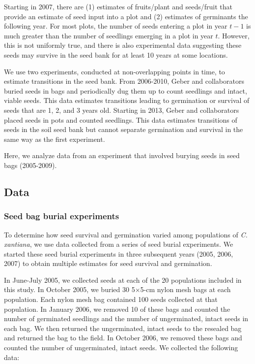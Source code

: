 \documentclass[12pt, oneside, titlepage]{article}   	%
\begin{document}
Starting in 2007, there are (1) estimates of fruits/plant and seeds/fruit that provide an estimate of seed input into a plot and (2) estimates of germinants the following year. For most plots, the number of seeds entering a plot in year $t-1$ is much greater than the number of seedlings emerging in a plot in year $t$. However, this is not uniformly true, and there is also experimental data suggesting these seeds may survive in the seed bank for at least 10 years at some locations.

We use two experiments, conducted at non-overlapping points in time, to estimate transitions in the seed bank. From 2006-2010, Geber and collaborators buried seeds in bags and periodically dug them up to count seedlings and intact, viable seeds. This data estimates transitions leading to germination or survival of seeds that are 1, 2, and 3 years old. Starting in 2013, Geber and collaborators placed seeds in pots and counted seedlings. This data estimates transitions of seeds in the soil seed bank but cannot separate germination and survival in the same way as the first experiment.

Here, we analyze data from an experiment that involved burying seeds in seed bags (2005-2009). 

\subsection*{Data}

\subsubsection*{Seed bag burial experiments}

To determine how seed survival and germination varied among populations of \textit{C. xantiana}, we use data collected from a series of seed burial experiments. We started these seed burial experiments in three subsequent years (2005, 2006, 2007) to obtain multiple estimates for seed survival and germination.

In June-July 2005, we collected seeds at each of the 20 populations included in this study. In October 2005, we buried 30 5$\times$5-cm nylon mesh bags at each population. Each nylon mesh bag contained 100 seeds collected at that population. In January 2006, we removed 10 of these bags and counted the number of germinated seedlings and the number of ungerminated, intact seeds in each bag. We then returned the ungerminated, intact seeds to the resealed bag and returned the bag to the field. In October 2006, we removed these bags and counted the number of ungerminated, intact seeds. We collected the following data:
\end{document}
